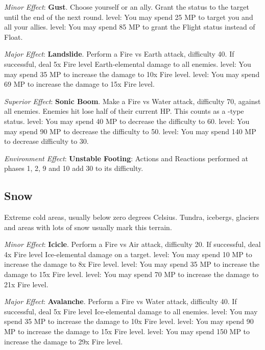 \begin{multicols}{2}
\textit{Minor Effect}: \textbf{Gust}. Choose yourself or an ally. Grant the  status to the target until the end of the next round.  level: You may spend 25 MP to target you and all your allies.  level: You may spend 85 MP to grant the Flight status instead of Float.

\textit{Major Effect}: \textbf{Landslide}. Perform a Fire vs Earth attack, difficulty 40. If successful, deal 5x Fire level Earth-elemental damage to all enemies.  level: You may spend 35 MP to increase the damage to 10x Fire level.  level: You may spend 69 MP to increase the damage to 15x Fire level.

\textit{Superior Effect}: \textbf{Sonic Boom}. Make a Fire vs Water attack, difficulty 70, against all enemies. Enemies hit lose half of their current HP\@. This counts as a -type status.  level: You may spend 40 MP to decrease the difficulty to 60.  level: You may spend 90 MP to decrease the difficulty to 50.  level: You may spend 140 MP to decrease difficulty to 30.

\textit{Environment Effect}: \textbf{Unstable Footing}: Actions and Reactions performed at phases 1, 2, 9 and 10 add 30 to its difficulty. 

\subsection*{Snow}\label{subsec:geo-snow}
Extreme cold areas, usually below zero degrees Celsius. Tundra, icebergs, glaciers and areas with lots of snow usually mark this terrain.

\textit{Minor Effect}: \textbf{Icicle}. Perform a Fire vs Air attack, difficulty 20. If successful, deal 4x Fire level Ice-elemental damage on a target.  level: You may spend 10 MP to increase the damage to 8x Fire level.  level: You may spend 35 MP to increase the damage to 15x Fire level.  level: You may spend 70 MP to increase the damage to 21x Fire level.

\textit{Major Effect}: \textbf{Avalanche}. Perform a Fire vs Water attack, difficulty 40. If successful, deal 5x Fire level Ice-elemental damage to all enemies.  level: You may spend 35 MP to increase the damage to 10x Fire level.  level: You may spend 90 MP to increase the damage to 15x Fire level.  level: You may spend 150 MP to increase the damage to 29x Fire level.


\end{multicols}
